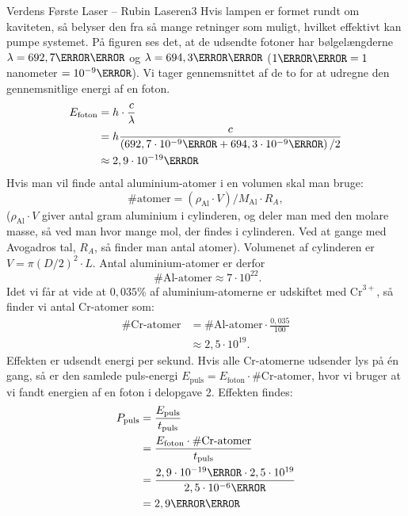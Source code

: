 \begin{opgave}{Verdens Første Laser -- Rubin Laseren}{3}
\opg Hvis lampen er formet rundt om kaviteten, så belyser den fra så mange retninger som muligt, hvilket effektivt kan pumpe systemet.
\opg På figuren ses det, at de udsendte fotoner har bølgelængderne $\lambda=692,7\nano\m$ og $\lambda=694,3\nano\m$ ($1\nano\m = 1$ nanometer $= 10^{-9}\m$). Vi tager gennemsnittet af de to for at udregne den gennemsnitlige energi af en foton.
\begin{align}
E_\text{foton} &= h \cdot \frac{c}{\lambda} \\
&= h \frac{c}{\left( 692,7 \cdot 10^{-9} \m + 694,3 \cdot 10^{-9} \m \right)/2} \\
&\approx 2,9 \cdot 10^{-19}\joule 
\end{align}
\opg Hvis man vil finde antal aluminium-atomer i en volumen skal man bruge:
\begin{equation}
\text{\# atomer} = (\rho_\text{Al} \cdot V)/M_\text{Al} \cdot R_A,
\end{equation}
($\rho_\text{Al} \cdot V$ giver antal gram aluminium i cylinderen, og deler man med den molare masse, så ved man hvor mange mol, der findes i cylinderen. Ved at gange med Avogadros tal, $R_A$, så finder man antal atomer). Volumenet af cylinderen er $V=\pi(D/2)^2 \cdot L$. Antal aluminium-atomer er derfor
\begin{equation}
\text{ \# Al-atomer} \approx 7 \cdot 10^{22}.
\end{equation}
Idet vi får at vide at $0,035\%$ af aluminium-atomerne er udskiftet med $\text{Cr}^{3+}$, så finder vi antal Cr-atomer som:
\begin{align}
\# \text{Cr-atomer} &= \#\text{Al-atomer} \cdot \frac{0,035}{100} \\
&\approx 2,5 \cdot 10^{19}.
\end{align}
\opg Effekten er udsendt energi per sekund. Hvis alle Cr-atomerne udsender lys på én gang, så er den samlede puls-energi $E_\text{puls} = E_\text{foton} \cdot \# \text{Cr-atomer}$, hvor vi bruger at vi fandt energien af en foton i delopgave 2. Effekten findes:
\begin{align}
P_\text{puls} &= \frac{E_\text{puls}}{t_\text{puls}} \\
&= \frac{ E_\text{foton} \cdot \# \text{Cr-atomer}}{t_\text{puls}} \\
&= \frac{2,9\cdot 10^{-19}\joule \cdot 2,5 \cdot 10^{19}}{2,5 \cdot 10^{-6}\s} \\
&= 2,9 \mega\watt
\end{align}

\end{opgave}
